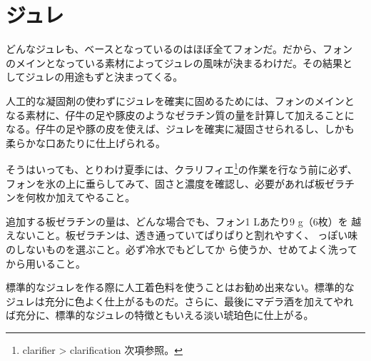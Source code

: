 \hypertarget{gelees-diverses}{%
\section{ジュレ}\label{gelees-diverses}}


 

どんなジュレも、ベースとなっているのはほぼ全てフォンだ。だから、フォン
のメインとなっている素材によってジュレの風味が決まるわけだ。その結果と
してジュレの用途もずと決まってくる。

人工的な凝固剤の使わずにジュレを確実に固めるためには、フォンのメインと
なる素材に、仔牛の足や豚皮のようなゼラチン質の量を計算して加えることに
なる。仔牛の足や豚の皮を使えば、ジュレを確実に凝固させられるし、しかも
柔らかな口あたりに仕上げられる。

そうはいっても、とりわけ夏季には、クラリフィエ\footnote{clarifier
  \textgreater{} clarification 次項参照。}の作業を行なう前に必ず、
フォンを氷の上に垂らしてみて、固さと濃度を確認し、必要があれば板ゼラチ
ンを何枚か加えてやること。

追加する板ゼラチンの量は、どんな場合でも、フォン1 Lあたり9 g（6枚）を
越えないこと。板ゼラチンは、透き通っていてぱりぱりと割れやすく、
っぽい味のしないものを選ぶこと。必ず冷水でもどしてか
ら使うか、せめてよく洗ってから用いること。

標準的なジュレを作る際に人工着色料を使うことはお勧め出来ない。標準的な
ジュレは充分に色よく仕上がるものだ。さらに、最後にマデラ酒を加えてやれ
ば充分に、標準的なジュレの特徴ともいえる淡い琥珀色に仕上がる。


